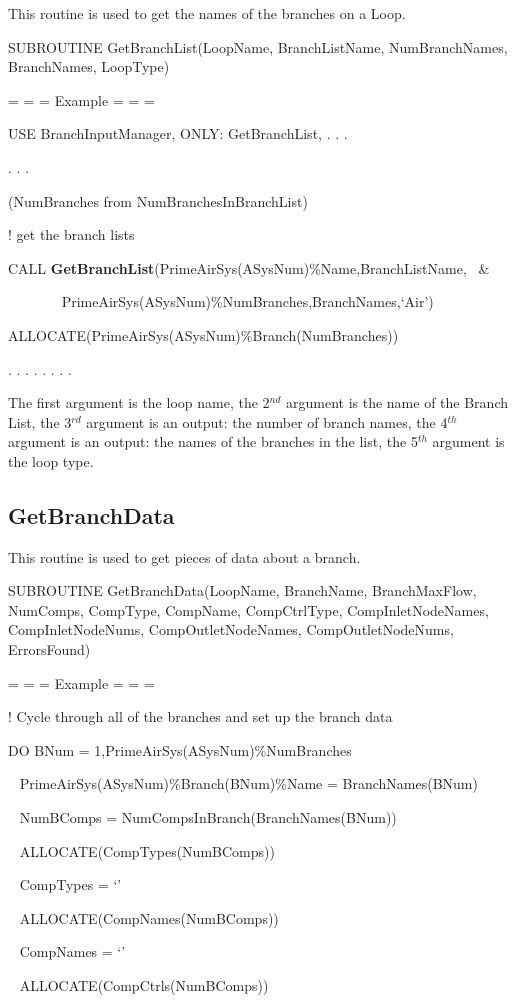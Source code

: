 This routine is used to get the names of the branches on a Loop.

SUBROUTINE GetBranchList(LoopName, BranchListName, NumBranchNames, BranchNames, LoopType)

= = = Example = = =

USE BranchInputManager, ONLY: GetBranchList, . . .

. . .

(NumBranches from NumBranchesInBranchList)

! get the branch lists

CALL \textbf{GetBranchList}(PrimeAirSys(ASysNum)\%Name,BranchListName, ~\&

~~~~~~~ PrimeAirSys(ASysNum)\%NumBranches,BranchNames,`Air')

ALLOCATE(PrimeAirSys(ASysNum)\%Branch(NumBranches))

. . . . . . . .

The first argument is the loop name, the 2\(^{nd}\) argument is the name of the Branch List, the 3\(^{rd}\) argument is an output: the number of branch names, the 4\(^{th}\) argument is an output: the names of the branches in the list, the 5\(^{th}\) argument is the loop type.

\subsection{GetBranchData}\label{getbranchdata}

This routine is used to get pieces of data about a branch.

SUBROUTINE GetBranchData(LoopName, BranchName, BranchMaxFlow, NumComps, CompType, CompName, CompCtrlType, CompInletNodeNames, CompInletNodeNums, CompOutletNodeNames, CompOutletNodeNums, ErrorsFound)

= = = Example = = =

! Cycle through all of the branches and set up the branch data

DO BNum = 1,PrimeAirSys(ASysNum)\%NumBranches

~ PrimeAirSys(ASysNum)\%Branch(BNum)\%Name = BranchNames(BNum)

~ NumBComps = NumCompsInBranch(BranchNames(BNum))

~ ALLOCATE(CompTypes(NumBComps))

~ CompTypes = `'

~ ALLOCATE(CompNames(NumBComps))

~ CompNames = `'

~ ALLOCATE(CompCtrls(NumBComps))

